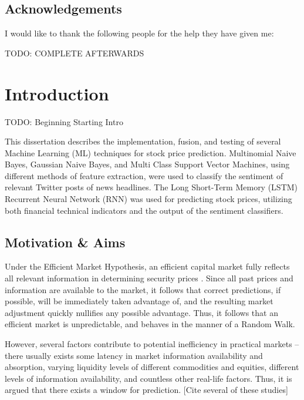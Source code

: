 \documentclass[12pt,a4paper,twoside,openright]{report}
\begin{document}
\bigskip
{}

\medskip
{}

\tableofcontents

\listoffigures

\newpage
\section*{Acknowledgements}

I would like to thank the following people for the help they have given me:

TODO: COMPLETE AFTERWARDS


\pagestyle{headings}

\chapter{Introduction}

TODO: Beginning Starting Intro

This dissertation describes the implementation, fusion, and testing of several Machine Learning (ML)
techniques for stock price prediction. Multinomial Naive Bayes, Gaussian Naive Bayes, and Multi Class
Support Vector Machines, using different methods of feature extraction, were used to classify the
sentiment of relevant Twitter posts of news headlines. The Long Short-Term Memory (LSTM) Recurrent 
Neural Network (RNN) was used for predicting stock prices, utilizing both
financial technical indicators and the output of the sentiment classifiers.


\section{Motivation \& Aims}

Under the Efficient Market Hypothesis, an efficient capital market fully reflects
all relevant information in determining security prices \cite{Malkiel89}. Since all past prices and
information are available to the market, it follows that correct predictions, if possible, will be immediately
taken advantage of, and the resulting market adjustment quickly nullifies any possible advantage. Thus,
it follows that an efficient market is unpredictable, and behaves in the manner of a Random Walk.

However, several factors contribute to potential inefficiency in practical markets --
there usually exists some latency in market information availability and absorption, varying liquidity levels
of different commodities and equities, different levels of information availability, and countless other
real-life factors. Thus, it is argued that there exists a window for prediction. [Cite several of these studies]
\end{document}
